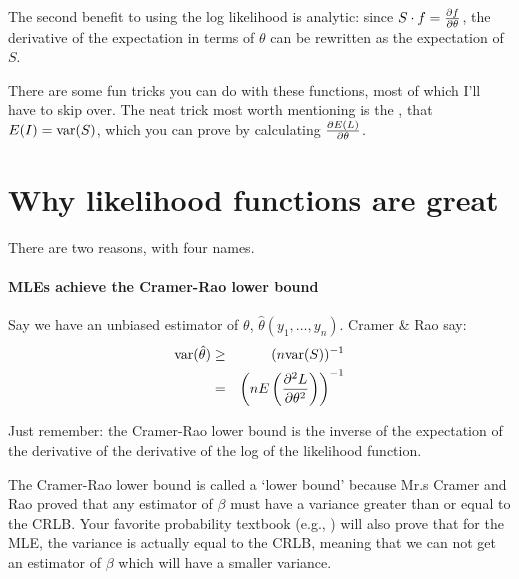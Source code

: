 The second benefit to using the log likelihood is analytic: since $S \cdot
f = {\partial f \over \partial \theta}$, the derivative of the expectation
in terms of $\theta$ can be rewritten as the expectation of $S$.

There are some fun tricks you can do with these functions, most of which
I'll have to skip over.  The neat trick most worth mentioning is the
, that $E(I)=\hbox{var}(S)$, which you can prove by
calculating ${\partial E(L)\over \partial \theta}$.

\section{Why likelihood functions are great} There are two reasons, with four names.

\paragraph{MLEs achieve the Cramer-Rao lower bound} 
        		\label{cr} 
Say we have an unbiased estimator of $\theta$,
$\hat\theta(y_1,\dots,y_n)$. Cramer \& Rao say:
\begin{eqnarray}
\hbox{var}(\hat\theta)&\geq&(n \hbox{var}(S))^{-1}		\nonumber\\
		&=&\left(nE\left({\partial^2 L\over \partial
\theta^2}\right)\right)^{-1}			\label{CRLB}
\nonumber\end{eqnarray}

Just remember: the Cramer-Rao lower bound is the inverse of the expectation of the
derivative of the derivative of the log of the likelihood function.

The Cramer-Rao lower bound is
called a `lower bound' because Mr.s Cramer and Rao proved that any
estimator of $\beta$ must have a variance greater than or equal to the
CRLB. Your favorite probability textbook (e.g., \cite{casella:berger})
will also prove that for the MLE, the variance is actually equal to the
CRLB, meaning that we can not get an estimator of $\beta$ which will
have a smaller variance.

